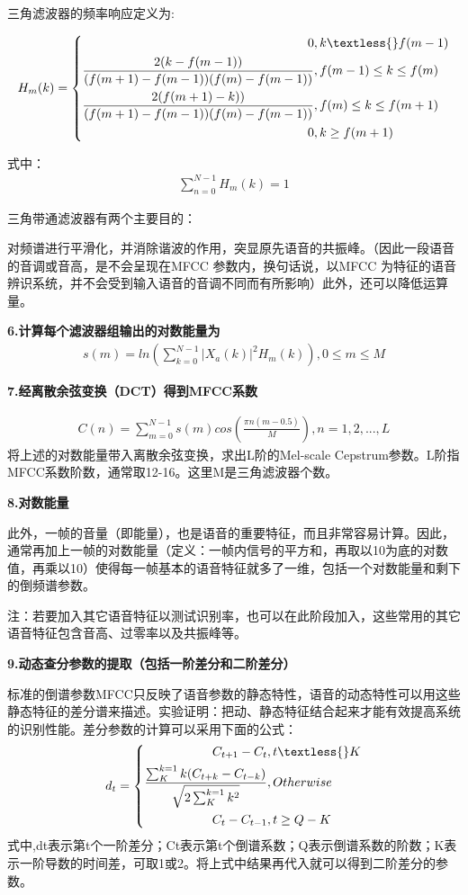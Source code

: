 \documentclass[11pt,a4paper,UTF8]{ctexart}
\begin{document}
	三角滤波器的频率响应定义为:
	
\begin{align}
H_m(k)=\left\{
\begin{aligned}
0 &,k\textless{}f(m-1)\\
\frac{2(k-f(m-1))}{(f(m+1)-f(m-1))(f(m)-f(m-1))} &, f(m-1)\le{}k\le{}f(m)\\
\frac{2(f(m+1)-k))}{(f(m+1)-f(m-1))(f(m)-f(m-1))} &,f(m)\le{}k\le{}f(m+1)\\
0 &,k\ge{}f(m+1)
\end{aligned}
\right.
\end{align}
	
	式中：
	\begin{align}
	\sum_{n=0}^{N-1}H_m(k)=1
	\end{align}
	
	
	三角带通滤波器有两个主要目的：
	
	对频谱进行平滑化，并消除谐波的作用，突显原先语音的共振峰。（因此一段语音的音调或音高，是不会呈现在MFCC 参数内，换句话说，以MFCC 为特征的语音辨识系统，并不会受到输入语音的音调不同而有所影响）此外，还可以降低运算量。
	
	\textbf{6.计算每个滤波器组输出的对数能量为}
	\begin{align}
	s(m)=ln(\sum_{k=0}^{N-1}|X_a(k)|^2H_m(k)),0\le{}m\le{}M
	\end{align}
	
	\textbf{7.经离散余弦变换（DCT）得到MFCC系数}
	
	\begin{align}
		C(n)=\sum_{m=0}^{N-1}s(m)cos(\frac{\pi{}n(m-0.5)}{M}),n=1,2,...,L
	\end{align}
	将上述的对数能量带入离散余弦变换，求出L阶的Mel-scale Cepstrum参数。L阶指MFCC系数阶数，通常取12-16。这里M是三角滤波器个数。
	
	\textbf{8.对数能量}
	
	此外，一帧的音量（即能量），也是语音的重要特征，而且非常容易计算。因此，通常再加上一帧的对数能量（定义：一帧内信号的平方和，再取以10为底的对数值，再乘以10）使得每一帧基本的语音特征就多了一维，包括一个对数能量和剩下的倒频谱参数。
	
	注：若要加入其它语音特征以测试识别率，也可以在此阶段加入，这些常用的其它语音特征包含音高、过零率以及共振峰等。
	
	\textbf{9.动态查分参数的提取（包括一阶差分和二阶差分）}
	
	标准的倒谱参数MFCC只反映了语音参数的静态特性，语音的动态特性可以用这些静态特征的差分谱来描述。实验证明：把动、静态特征结合起来才能有效提高系统的识别性能。差分参数的计算可以采用下面的公式：
	\begin{align}
	d_t=\left\{
	\begin{aligned}
	C_{t+1}-C_t  &, t\textless{}K\\
	\frac{\sum_{K}^{k=1}k(C_{t+k}-C_{t-k})}{\sqrt{2\sum_{K}^{k=1}k^2}} &, Otherwise \\
	C_t-C_{t-1} &, t\ge{}Q-K
	\end{aligned}
	\right.
	\end{align}
	式中,dt表示第t个一阶差分；Ct表示第t个倒谱系数；Q表示倒谱系数的阶数；K表示一阶导数的时间差，可取1或2。将上式中结果再代入就可以得到二阶差分的参数。
\end{document}
